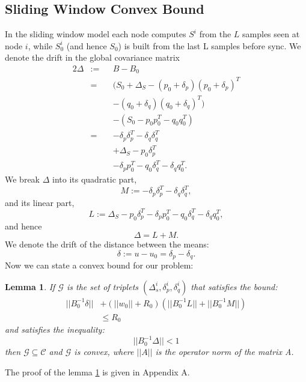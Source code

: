 \documentclass[11pt,twocolumn,varwidth=true,a4paper,fleqn]{article}
\newtheorem{lemma}{Lemma}
\begin{document}
\subsection{Sliding Window Convex Bound}
In the sliding window model each node computes $S^i$ from the $L$ samples seen
at node $i$, while $S_0^i$ (and hence $S_0$) is built from the last L samples before
sync. 
We denote the drift in the global covariance matrix
\begin{alignat*}{2}
\Delta & := && B-B_0 \\
& = && (S_0+\Delta_S - (p_0+\delta_p)(p_0+\delta_p)^T \\
& && - (q_0+\delta_q)(q_0+\delta_q)^T) \\
& && - (S_0 - p_0p_0^T - q_0q_0^T) \\
& = && - \delta_p\delta_p^T - \delta_q\delta_q^T \\
& && + \Delta_S - p_0\delta_p^T \\
& && - \delta_pp_0^T - q_0\delta_q^T - \delta_qq_0^T.
\end{alignat*}
We break $\Delta$ into its quadratic part,
\begin{equation*}
M:= - \delta_p\delta_p^T - \delta_q\delta_q^T, 
\end{equation*}
and its linear part,
\begin{equation*}
L:= \Delta_S - p_0\delta_p^T - \delta_pp_0^T - q_0\delta_q^T - \delta_qq_0^T, 
\end{equation*}
and hence 
\begin{equation*}
\Delta= L+ M.
\end{equation*}
We denote the drift of the distance between the means:
\begin{equation*}
\delta:= u-u_0 = \delta_p - \delta_q.
\end{equation*}
Now we can state a convex bound for our problem:
\begin{lemma} \label{convexBound}
If $\mathcal{G}$ is the set of triplets $(\Delta_s^i, \delta_p^i, \delta_q^i)$
 that satisfies the bound:
 \begin{equation} \label{eq:convexBound}
\begin{split}
||B_0^{-1}\delta|| &+ (||w_0||+R_0)(||B_0^{-1}L||+||B_0^{-1}M||) \\ & \leq  R_0
\end{split}
\end{equation}
and satisfies the inequality:
 \begin{equation*} 
||B_0^{-1}\Delta|| < 1
\end{equation*}
 then $\mathcal{G}
 \subseteq \mathcal{C}$ and $\mathcal{G}$ is convex, where $||A||$ is the
 operator norm of the matrix A.
\end{lemma}
The proof of the lemma \ref{convexBound} is given in Appendix A.
\end{document}

